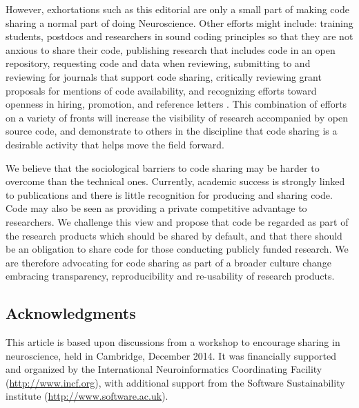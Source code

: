 \documentclass[11pt]{article}
\begin{document}
However, exhortations such as this editorial are only a small part of making code sharing a normal part of doing Neuroscience. Other efforts might include: training students,  postdocs and researchers in sound coding principles so that they are not anxious to share their code, publishing research that includes code in an open repository, requesting code and data when reviewing, submitting to and reviewing for journals that support code sharing, critically reviewing grant proposals
 for mentions of code availability, and recognizing efforts toward openness in hiring, promotion, and reference letters \cite{leveque2012reproducible}. This combination of efforts on a variety of fronts will increase the visibility of research accompanied by open source code, and demonstrate to others in the discipline that code sharing is a desirable activity that helps move the field forward. 

We believe that the sociological barriers to code sharing may be harder to overcome than the technical ones. Currently, academic success is strongly linked to publications and there is little recognition for producing and sharing code. Code may also be seen as providing a private competitive advantage to researchers. We challenge this view and propose that code be regarded as part of the research products which should be shared by default, and that there should be an obligation to share code for those conducting publicly funded research. We are therefore advocating for code sharing as part of a broader culture change embracing transparency, reproducibility and re-usability of research products.   

\subsection*{Acknowledgments}

This article is based upon discussions from a workshop to encourage
sharing in neuroscience, held in Cambridge, December 2014.  It was
financially supported and organized by the International
Neuroinformatics Coordinating Facility (\url{http://www.incf.org}),
with additional support from the Software Sustainability institute
(\url{http://www.software.ac.uk}).


\printbibliography
\end{document}
